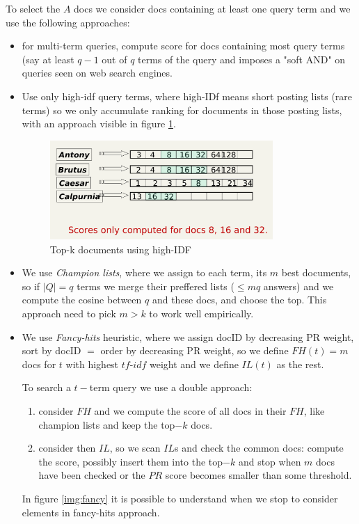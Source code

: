 To select the $A$ docs we consider docs containing at least one query term
and we use the following approaches:
\begin{itemize}
    \item for multi-term queries, compute score for docs containing
	  most query terms (say at least $q-1$ out of $q$ terms of the 
	  query and imposes a "soft AND" on queries seen on web search engines.

   \item Use only high-idf query terms, where high-IDf means short posting
	 lists (rare terms) so we only accumulate ranking for documents 
	 in those posting lists, with an approach visible
	 in figure \ref{img:highIDF}.

	 \begin{figure}
		 \includegraphics[width=0.8\textwidth]{Images/highIDF}
		 \caption{Top-k documents using high-IDF}
		 \label{img:highIDF}
	 \end{figure}

   \item We use \emph{Champion lists}, where we assign to each term, its
	 $m$ best documents, so if $|Q| = q$ terms we merge their preffered
         lists ($\leq mq$ answers) and we compute the cosine between $q$
	 and these docs, and choose the top.\newline
	 This approach need to pick $m > k$ to work well empirically.

   \item We use \emph{Fancy-hits} heuristic, where we assign docID by
	 decreasing PR weight, sort by docID $=$ order by decreasing 
	 PR weight, so we define $FH(t) = m$ docs for $t$ with 
	 highest $tf$-$idf$ weight and we define $IL(t)$ as the rest.

	 To search a $t-$term query we use a double approach:
	 \begin{enumerate}
	    \item consider $FH$ and we compute the score of all docs in their
		  $FH$, like champion lists and keep the top$-k$ docs.
	    \item consider then $IL$, so we scan $IL$s and check the common 
		  docs: compute the score, possibly insert them into 
		  the top$-k$ and stop when $m$ docs have been checked or
		  the $PR$ score becomes smaller than some threshold.
	 \end{enumerate}
         In figure \ref{img:fancy} it is possible to understand when we 
	 stop to consider elements in fancy-hits approach.


\end{itemize}
